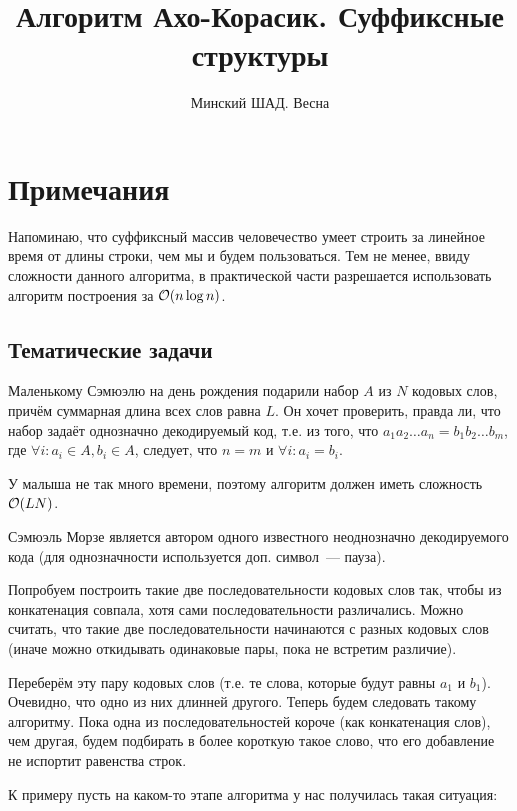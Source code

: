 \documentclass[addpoints]{exam}
\title{Алгоритм Ахо-Корасик. Суффиксные структуры}
\author{Минский ШАД. Весна}
\begin{document}
\printanswers
\maketitle

\section{Примечания}

Напоминаю, что суффиксный массив человечество умеет строить за линейное время от длины строки, чем мы и будем пользоваться. Тем не менее, ввиду сложности данного алгоритма, в практической части разрешается использовать алгоритм построения за $\mathcal{O}(n \log{n})$. 

\begin{questions}

\section{Тематические задачи}

\question[1 \half] Маленькому Сэмюэлю на день рождения подарили набор $A$ из $N$ кодовых слов, причём суммарная длина всех слов равна $L$. Он хочет проверить, правда ли, что набор задаёт однозначно декодируемый код, т.е. из того, что $a_1 a_2 \ldots a_n = b_1 b_2 \ldots b_m$, где $\forall i: a_i \in A, b_i \in A$, следует, что $n=m$ и $\forall i: a_i = b_i$.

У малыша не так много времени, поэтому алгоритм должен иметь сложность $\mathcal{O}(LN)$.

\begin{solution}

Сэмюэль Морзе является автором одного известного неоднозначно декодируемого кода (для однозначности используется доп. символ~--- пауза).

Попробуем построить такие две последовательности кодовых слов так, чтобы из конкатенация совпала, хотя сами последовательности различались. Можно считать, что такие две последовательности начинаются с разных кодовых слов (иначе можно откидывать одинаковые пары, пока не встретим различие).

Переберём эту пару кодовых слов (т.е. те слова, которые будут равны $a_1$ и $b_1$). Очевидно, что одно из них длинней другого. Теперь будем следовать такому алгоритму. Пока одна из последовательностей короче (как конкатенация слов), чем другая, будем подбирать в более короткую такое слово, что его добавление не испортит равенства строк.

К примеру пусть на каком-то этапе алгоритма у нас получилась такая ситуация:


\end{solution}
\end{questions}
\end{document}
